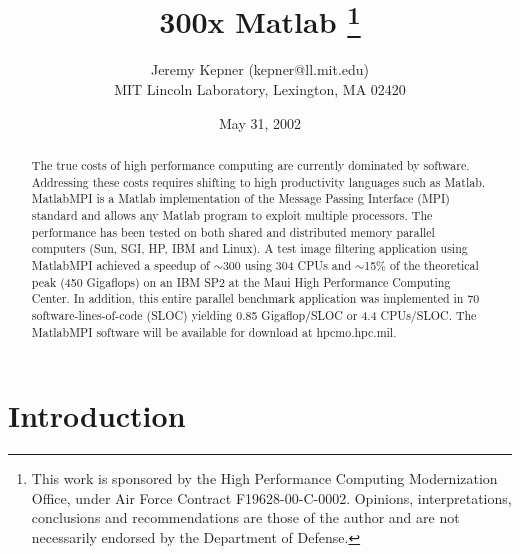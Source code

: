 \documentclass[11pt,twocolumn]{article}
\begin{document}

\title{300x Matlab
\thanks{
This work is sponsored by the High Performance Computing Modernization
Office, under Air Force Contract
F19628-00-C-0002.  Opinions, interpretations, conclusions and
recommendations are those of the author and are not necessarily endorsed
by the Department of Defense.
}}

\author{Jeremy Kepner  (kepner@ll.mit.edu) \\
MIT Lincoln Laboratory, Lexington, MA  02420 \\
}

\date{May 31, 2002}
\maketitle


\begin{abstract}

  The true costs of high performance computing are currently dominated
by software.  Addressing these costs requires shifting to high
productivity languages such as Matlab.  MatlabMPI is a Matlab
implementation of the Message Passing Interface (MPI) standard and
allows any Matlab program to exploit multiple processors.  The
performance has been tested on both shared and distributed memory
parallel computers (Sun, SGI, HP, IBM and Linux).  A test image
filtering application using MatlabMPI achieved a speedup of $\sim$300
using 304 CPUs and $\sim$15\% of the theoretical peak (450 Gigaflops)
on an IBM SP2 at the Maui High Performance Computing Center.  In
addition, this entire parallel benchmark application was implemented
in 70 software-lines-of-code (SLOC) yielding 0.85 Gigaflop/SLOC or 4.4
CPUs/SLOC.  The MatlabMPI software will be available for download at
hpcmo.hpc.mil.

\end{abstract}

\section{Introduction}
\end{document}
